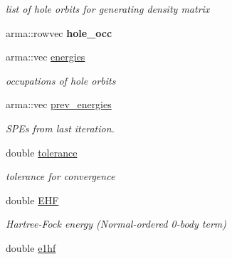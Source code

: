 \begin{DoxyCompactItemize}
\begin{DoxyCompactList}\small\item\em list of hole orbits for generating density matrix \end{DoxyCompactList}\item 
arma\+::rowvec {\bfseries hole\+\_\+occ}\hypertarget{classHartreeFock_a0c11fc0a59ceaeeb415a0e6c8d85e604}{}\label{classHartreeFock_a0c11fc0a59ceaeeb415a0e6c8d85e604}

\item 
arma\+::vec \hyperlink{classHartreeFock_a415fc1fbbba3a6a84d47e31ed18323c9}{energies}
\begin{DoxyCompactList}\small\item\em occupations of hole orbits \end{DoxyCompactList}\item 
arma\+::vec \hyperlink{classHartreeFock_a43e2a195ad044947a9e1fb9f3a937d8a}{prev\+\_\+energies}\hypertarget{classHartreeFock_a43e2a195ad044947a9e1fb9f3a937d8a}{}\label{classHartreeFock_a43e2a195ad044947a9e1fb9f3a937d8a}

\begin{DoxyCompactList}\small\item\em S\+PE\textquotesingle{}s from last iteration. \end{DoxyCompactList}\item 
double \hyperlink{classHartreeFock_a22c754579ad1a45f053a5305e87d4700}{tolerance}\hypertarget{classHartreeFock_a22c754579ad1a45f053a5305e87d4700}{}\label{classHartreeFock_a22c754579ad1a45f053a5305e87d4700}

\begin{DoxyCompactList}\small\item\em tolerance for convergence \end{DoxyCompactList}\item 
double \hyperlink{classHartreeFock_a16c9e1791919c2ceef5584bdc9b84a81}{E\+HF}\hypertarget{classHartreeFock_a16c9e1791919c2ceef5584bdc9b84a81}{}\label{classHartreeFock_a16c9e1791919c2ceef5584bdc9b84a81}

\begin{DoxyCompactList}\small\item\em Hartree-\/\+Fock energy (Normal-\/ordered 0-\/body term) \end{DoxyCompactList}\item 
double \hyperlink{classHartreeFock_a0f94913a966701c27fde108b98e89b41}{e1hf}\hypertarget{classHartreeFock_a0f94913a966701c27fde108b98e89b41}{}\label{classHartreeFock_a0f94913a966701c27fde108b98e89b41}


\end{DoxyCompactItemize}
